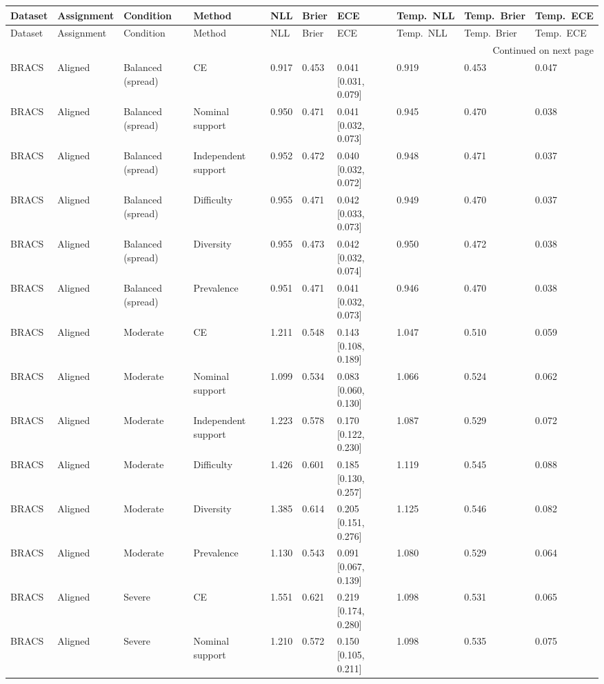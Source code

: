 \begin{longtable}{llllllllll}
\toprule
Dataset & Assignment & Condition & Method & NLL & Brier & ECE & Temp.\ NLL & Temp.\ Brier & Temp.\ ECE \\
\midrule
\endfirsthead
\toprule
Dataset & Assignment & Condition & Method & NLL & Brier & ECE & Temp.\ NLL & Temp.\ Brier & Temp.\ ECE \\
\midrule
\endhead
\midrule
\multicolumn{10}{r}{Continued on next page} \\
\midrule
\endfoot
\bottomrule
\endlastfoot
BRACS & Aligned & Balanced (spread) & CE & 0.917 & 0.453 & 0.041 [0.031, 0.079] & 0.919 & 0.453 & 0.047 \\
BRACS & Aligned & Balanced (spread) & Nominal support & 0.950 & 0.471 & 0.041 [0.032, 0.073] & 0.945 & 0.470 & 0.038 \\
BRACS & Aligned & Balanced (spread) & Independent support & 0.952 & 0.472 & 0.040 [0.032, 0.072] & 0.948 & 0.471 & 0.037 \\
BRACS & Aligned & Balanced (spread) & Difficulty & 0.955 & 0.471 & 0.042 [0.033, 0.073] & 0.949 & 0.470 & 0.037 \\
BRACS & Aligned & Balanced (spread) & Diversity & 0.955 & 0.473 & 0.042 [0.032, 0.074] & 0.950 & 0.472 & 0.038 \\
BRACS & Aligned & Balanced (spread) & Prevalence & 0.951 & 0.471 & 0.041 [0.032, 0.073] & 0.946 & 0.470 & 0.038 \\
BRACS & Aligned & Moderate & CE & 1.211 & 0.548 & 0.143 [0.108, 0.189] & 1.047 & 0.510 & 0.059 \\
BRACS & Aligned & Moderate & Nominal support & 1.099 & 0.534 & 0.083 [0.060, 0.130] & 1.066 & 0.524 & 0.062 \\
BRACS & Aligned & Moderate & Independent support & 1.223 & 0.578 & 0.170 [0.122, 0.230] & 1.087 & 0.529 & 0.072 \\
BRACS & Aligned & Moderate & Difficulty & 1.426 & 0.601 & 0.185 [0.130, 0.257] & 1.119 & 0.545 & 0.088 \\
BRACS & Aligned & Moderate & Diversity & 1.385 & 0.614 & 0.205 [0.151, 0.276] & 1.125 & 0.546 & 0.082 \\
BRACS & Aligned & Moderate & Prevalence & 1.130 & 0.543 & 0.091 [0.067, 0.139] & 1.080 & 0.529 & 0.064 \\
BRACS & Aligned & Severe & CE & 1.551 & 0.621 & 0.219 [0.174, 0.280] & 1.098 & 0.531 & 0.065 \\
BRACS & Aligned & Severe & Nominal support & 1.210 & 0.572 & 0.150 [0.105, 0.211] & 1.098 & 0.535 & 0.075 \\

\end{longtable}
